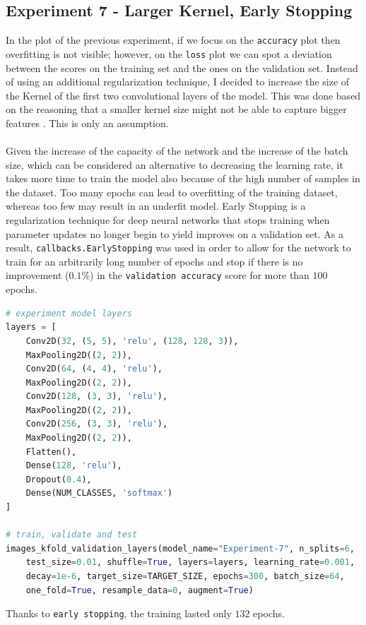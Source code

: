\documentclass[11pt,a4paper]{article}
\begin{document}
\subsection{Experiment 7 - Larger Kernel, Early Stopping}
In the plot of the previous experiment, if we focus on the \texttt{accuracy} plot then overfitting is not visible; however, on the \texttt{loss} plot we can spot a deviation between the scores on the training set and the ones on the validation set. Instead of using an additional regularization technique, I decided to increase the size of the Kernel of the first two convolutional layers of the model. This was done based on the reasoning that a smaller kernel size might not be able to capture bigger features \cite{8742484}. This is only an assumption.\\
\\
Given the increase of the capacity of the network and the increase of the batch size, which can be considered an alternative to decreasing the learning rate, it takes more time to train the model also because of the high number of samples in the dataset. Too many epochs can lead to overfitting of the training dataset, whereas too few may result in an underfit model. Early Stopping is a regularization technique for deep neural networks that stops training when parameter updates no longer begin to yield improves on a validation set. As a result, \texttt{callbacks.EarlyStopping} was used in order to allow for the network to train for an arbitrarily long number of epochs and stop if there is no improvement ($0.1\%$) in the \texttt{validation accuracy} score for more than $100$ epochs.
\begin{lstlisting}[language=Python,frame=single]
# experiment model layers
layers = [
    Conv2D(32, (5, 5), 'relu', (128, 128, 3)),
    MaxPooling2D((2, 2)),
    Conv2D(64, (4, 4), 'relu'),
    MaxPooling2D((2, 2)),
    Conv2D(128, (3, 3), 'relu'),
    MaxPooling2D((2, 2)),
    Conv2D(256, (3, 3), 'relu'),
    MaxPooling2D((2, 2)),
    Flatten(),
    Dense(128, 'relu'),
    Dropout(0.4),
    Dense(NUM_CLASSES, 'softmax')
]

# train, validate and test
images_kfold_validation_layers(model_name="Experiment-7", n_splits=6,
    test_size=0.01, shuffle=True, layers=layers, learning_rate=0.001,
    decay=1e-6, target_size=TARGET_SIZE, epochs=300, batch_size=64,
    one_fold=True, resample_data=0, augment=True)
\end{lstlisting}
Thanks to \texttt{early stopping}, the training lasted only $132$ epochs.
\end{document}
